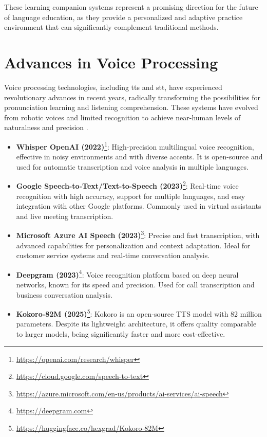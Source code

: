 These learning companion systems represent a promising direction for the future of language education, as they provide a personalized and adaptive practice environment that can significantly complement traditional methods.

\section{Advances in Voice Processing}
\label{sec:voice-processing}

Voice processing technologies, including \gls{tts} and \gls{stt}, have experienced revolutionary advances in recent years, radically transforming the possibilities for pronunciation learning and listening comprehension. These systems have evolved from robotic voices and limited recognition to achieve near-human levels of naturalness and precision \citep{graves2013speech}.


\begin{itemize}
  \item \textbf{Whisper OpenAI (2022)}\footnote{\url{https://openai.com/research/whisper}}: High-precision multilingual voice recognition, effective in noisy environments and with diverse accents. It is \gls{open-source} and used for automatic transcription and voice analysis in multiple languages.
  \item \textbf{Google Speech-to-Text/Text-to-Speech (2023)}\footnote{\url{https://cloud.google.com/speech-to-text}}: Real-time voice recognition with high accuracy, support for multiple languages, and easy integration with other Google platforms. Commonly used in virtual assistants and live meeting transcription.
  \item \textbf{Microsoft Azure AI Speech (2023)}\footnote{\url{https://azure.microsoft.com/en-us/products/ai-services/ai-speech}}: Precise and fast transcription, with advanced capabilities for personalization and context adaptation. Ideal for customer service systems and real-time conversation analysis.
  \item \textbf{Deepgram (2023)}\footnote{\url{https://deepgram.com}}: Voice recognition platform based on deep neural networks, known for its speed and precision. Used for call transcription and business conversation analysis.
  \item \textbf{Kokoro-82M (2025)}\footnote{\url{https://huggingface.co/hexgrad/Kokoro-82M}}: Kokoro is an open-source TTS model with 82 million parameters. Despite its lightweight architecture, it offers quality comparable to larger models, being significantly faster and more cost-effective.
\end{itemize}

